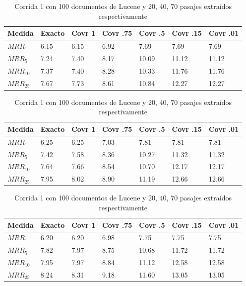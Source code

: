 \begin{table}[H]
\centering
\begin{center}
\begin{tabular}{|l | l | l | l | l | l | l |}
\hline
Medida & Exacto & Covr 1 & Covr .75 & Covr .5 & Covr .15 & Covr .01 \\ \hline
$MRR_{1}$ & 6.15 & 6.15 & 6.92 & 7.69 & 7.69 & 7.69  \\ \hline
$MRR_{5}$ & 7.24 & 7.40 & 8.17 & 10.09 & 11.12 & 11.12  \\ \hline
$MRR_{10}$ & 7.37 & 7.40 & 8.28 & 10.33 & 11.76 & 11.76  \\ \hline
$MRR_{25}$ & 7.67 & 7.73 & 8.61 & 10.84 & 12.27 & 12.27  \\ \hline
\end{tabular}

\medskip

\begin{tabular}{|l | l | l | l | l | l | l |}
\hline
Medida & Exacto & Covr 1 & Covr .75 & Covr .5 & Covr .15 & Covr .01 \\ \hline
$MRR_{1}$ & 6.25 & 6.25 & 7.03 & 7.81 & 7.81 & 7.81  \\ \hline
$MRR_{5}$ & 7.42 & 7.58 & 8.36 & 10.27 & 11.32 & 11.32  \\ \hline
$MRR_{10}$ & 7.64 & 7.66 & 8.54 & 10.70 & 12.17 & 12.17  \\ \hline
$MRR_{25}$ & 7.95 & 8.02 & 8.90 & 11.19 & 12.66 & 12.66  \\ \hline
\end{tabular}

\medskip

\begin{tabular}{|l | l | l | l | l | l | l |}
\hline
Medida & Exacto & Covr 1 & Covr .75 & Covr .5 & Covr .15 & Covr .01 \\ \hline
$MRR_{1}$ & 6.20 & 6.20 & 6.98 & 7.75 & 7.75 & 7.75  \\ \hline
$MRR_{5}$ & 7.82 & 7.97 & 8.75 & 10.68 & 11.72 & 11.72  \\ \hline
$MRR_{10}$ & 7.95 & 7.97 & 8.84 & 11.12 & 12.58 & 12.58  \\ \hline
$MRR_{25}$ & 8.24 & 8.31 & 9.18 & 11.60 & 13.05 & 13.05  \\ \hline
\end{tabular}

\caption{Corrida 1 con 100 documentos de Lucene y 20, 40, 70 pasajes extraídos respectivamente}
\label{table:1_100_getExactMRRWikiFactoid_getCovrMRRWikiFactoid}
\end{center}
\end{table}





